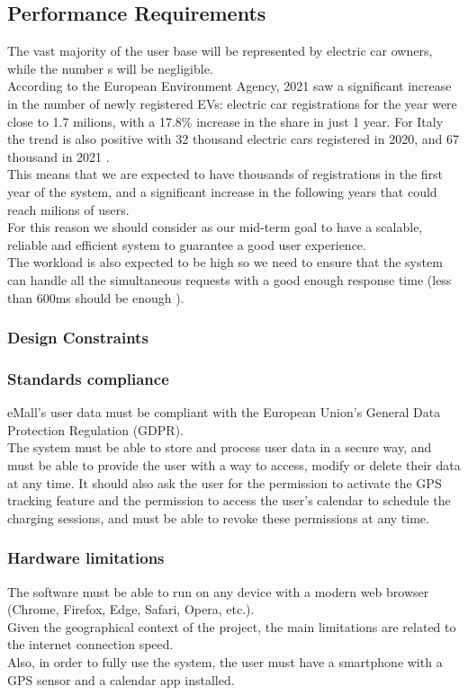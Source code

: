 \documentclass[table, 12pt]{article} %
\begin{document}
    \subsection{Performance Requirements}
    The vast majority of the user base will be represented by electric car owners, while the number s will be negligible.\\
    According to the European Environment Agency, 2021 saw a significant increase in the number of newly registered EVs:
    electric car registrations for the year were close to 1.7 milions, with a 17.8\% increase in the share in just 1 year.
    For Italy the trend is also positive with 32 thousand electric cars registered in 2020, and 67 thousand in 2021 \cite{EV registrations}.\\
    This means that we are expected to have thousands of registrations in the first year of the system, and a significant increase in the following years that could reach milions of users.\\
    For this reason we should consider as our mid-term goal to have a scalable, reliable and efficient system to guarantee a good user experience.\\
    The workload is also expected to be high so we need to ensure that the system can handle all the simultaneous requests with a good enough response time (less than 600ms should be enough ).

    \subsubsection{Design Constraints}
    \subsubsection{Standards compliance}
    eMall's user data must be compliant with the European Union's General Data Protection Regulation (GDPR). \\
    The system must be able to store and process user data in a secure way, and must be able to provide the user with a way to access, modify or delete their data at any time.
    It should also ask the user for the permission to activate the GPS tracking feature and the permission to access the user's calendar to schedule the charging sessions, and must be able to revoke these permissions at any time.
    
    \subsubsection{Hardware limitations}
    The software must be able to run on any device with a modern web browser (Chrome, Firefox, Edge, Safari, Opera, etc.).\\
    Given the geographical context of the project, the main limitations are related to the internet connection speed.\\
    Also, in order to fully use the system, the user must have a smartphone with a GPS sensor and a calendar app installed.
\end{document}
